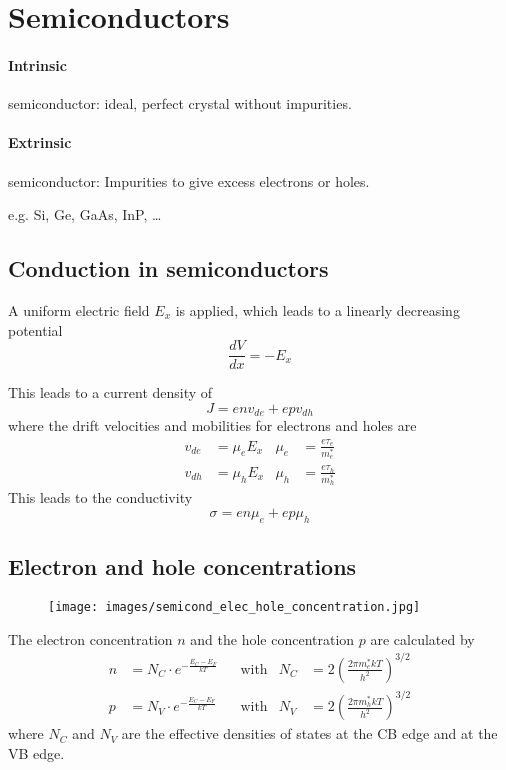 \section{Semiconductors}
\paragraph{Intrinsic} semiconductor: ideal, perfect crystal without impurities.
\paragraph{Extrinsic} semiconductor: Impurities to give excess electrons or holes.

e.g. Si, Ge, GaAs, InP, \ldots

\subsection{Conduction in semiconductors}
A uniform electric field $E_x$ is applied, which leads to a linearly decreasing potential
\begin{equation}
    \frac{dV}{dx} = -E_x
\end{equation}


This leads to a current density of
\begin{equation}
    J = e n v_{de} + e p v_{dh}
\end{equation}
where the drift velocities and mobilities for electrons and holes are
\begin{align*}
    v_{de} &= \mu_e E_x & \mu_e &= \frac{e \tau_e}{m_e^*} \\
    v_{dh} &= \mu_h E_x & \mu_h &= \frac{e \tau_h}{m_h^*}
\end{align*}
This leads to the conductivity
\begin{equation}
    \sigma = e n \mu_e + e p \mu_h
\end{equation}

\subsection{Electron and hole concentrations}
\begin{figure}[ht!]
    \centering
    \texttt{[image: images/semicond\_elec\_hole\_concentration.jpg]}
\end{figure}

The electron concentration $n$ and the hole concentration $p$ are calculated by
\begin{align}
    n &= N_C \cdot e^{-\frac{E_C-E_F}{k T}} && \text{with} & N_C &= 2 \left( \frac{2 \pi m_e^* k T}{h^2} \right)^{3/2} \\
    p &= N_V \cdot e^{-\frac{E_C-E_F}{k T}} && \text{with} & N_V &= 2 \left( \frac{2 \pi m_h^* k T}{h^2} \right)^{3/2}
\end{align}
where $N_C$ and $N_V$ are the effective densities of states at the CB edge and at the VB edge.

